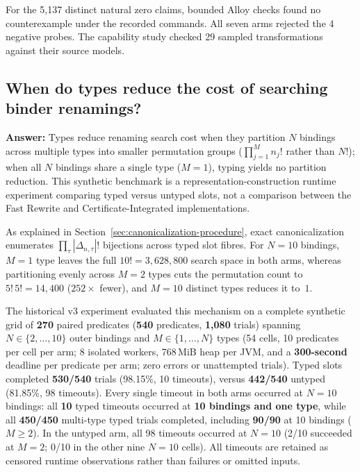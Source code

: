 For the 5,137 distinct natural zero claims, bounded Alloy checks
found no counterexample under the recorded commands. All seven arms rejected
the 4 negative probes. The capability study checked 29 sampled
transformations against their source models.

\subsection{When do types reduce the cost of searching binder renamings?}
\label{sec:eval-synthetic}

\textbf{Answer:} Types reduce renaming search cost when they partition $N$
bindings across multiple types into smaller permutation groups
($\prod_{j=1}^M n_j!$ rather than $N!$); when all $N$ bindings share a single
type ($M=1$), typing yields no partition reduction. This synthetic benchmark is a
representation-construction runtime experiment comparing typed versus untyped
slots, not a comparison between the Fast Rewrite and Certificate-Integrated
implementations.

As explained in Section~\ref{sec:canonicalization-procedure}, exact
canonicalization enumerates $\prod_\tau |\Delta_{n,\tau}|!$ bijections across
typed slot fibres. For $N=10$ bindings, $M=1$ type leaves the full
$10!=3{,}628{,}800$ search space in both arms, whereas partitioning evenly across
$M=2$ types cuts the permutation count to $5!\,5!=14{,}400$ ($252\times$ fewer),
and $M=10$ distinct types reduces it to~$1$.

The historical v3 experiment evaluated this mechanism on a complete synthetic grid of \textbf{270} paired
predicates (\textbf{540} predicates, \textbf{1,080} trials) spanning
$N\in\{2,\dots,10\}$ outer bindings and $M\in\{1,\dots,N\}$ types (54 cells, 10
predicates per cell per arm; 8 isolated workers, 768\,MiB heap per JVM, and a
\textbf{300-second} deadline per predicate per arm; zero errors or unattempted
trials). Typed slots completed \textbf{530/540} trials (98.15\%, 10 timeouts),
versus \textbf{442/540} untyped (81.85\%, 98 timeouts). Every single timeout in
both arms occurred at $N=10$ bindings: all \textbf{10} typed timeouts occurred
at \textbf{10 bindings and one type}, while all \textbf{450/450} multi-type
typed trials completed, including \textbf{90/90} at 10 bindings ($M\ge 2$). In
the untyped arm, all 98 timeouts occurred at $N=10$ (2/10 succeeded at
$M=2$; 0/10 in the other nine $N=10$ cells). All timeouts are retained as
censored runtime observations rather than failures or omitted inputs.

